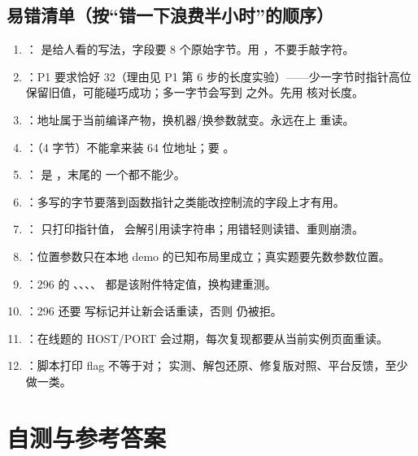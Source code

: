 \documentclass[UTF8,12pt,oneside]{ctexbook}
\begin{document}
\section{易错清单（按“错一下浪费半小时”的顺序）}
\begin{enumerate}
\item {}： 是给人看的写法，字段要 8 个原始字节。用 ，不要手敲字符。
\item {}：P1 要求恰好 32（理由见 P1 第 6 步的长度实验）——少一字节时指针高位保留旧值，可能碰巧成功；多一字节会写到  之外。先用  核对长度。
\item {}：地址属于当前编译产物，换机器/换参数就变。永远在上  重读。
\item {}：（4 字节）不能拿来装 64 位地址；要 。
\item {}： 是 ，末尾的  一个都不能少。
\item {}：多写的字节要落到函数指针之类能改控制流的字段上才有用。
\item {}： 只打印指针值， 会解引用读字符串；用错轻则读错、重则崩溃。
\item {}：位置参数只在本地 demo 的已知布局里成立；真实题要先数参数位置。
\item {}：296 的 、、、、 都是该附件特定值，换构建重测。
\item {}：296 还要  写标记并让新会话重读，否则  仍被拒。
\item {}：在线题的 HOST/PORT 会过期，每次复现都要从当前实例页面重读。
\item {}：脚本打印 flag 不等于对； 实测、解包还原、修复版对照、平台反馈，至少做一类。
\end{enumerate}


\chapter{自测与参考答案}
\end{document}
